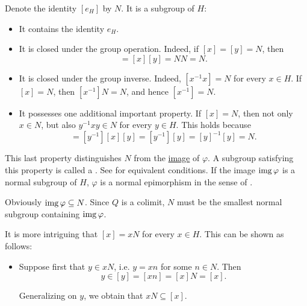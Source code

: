 \begin{definition}
\begin{thmenum}
    Denote the identity \( [e_H] \) by \( N \). It is a subgroup of \( H \):
    \begin{itemize}
      \item It contains the identity \( e_H \).
      \item It is closed under the group operation. Indeed, if \( [x] = [y] = N \), then
      \begin{equation*}
        [xy] = [x][y] = NN = N.
      \end{equation*}

      \item It is closed under the group inverse. Indeed, \( [x^{-1} x] = N \) for every \( x \in H \). If \( [x] = N \), then \( [x^{-1}] N = N \), and hence \( [x^{-1}] = N \).

      \item It possesses one additional important property. If \( [x] = N \), then not only \( x \in N \), but also \( y^{-1} x y \in N \) for every \( y \in H \). This holds because
      \begin{equation*}
        [y^{-1} x y]
        =
        [y^{-1}] [x] [y]
        =
        [y^{-1}] [y]
        =
        [y]^{-1} [y]
        =
        N.
      \end{equation*}
    \end{itemize}

    This last property distinguishes \( N \) from the \hyperref[def:multi_valued_function/image]{image} of \( \varphi \). A subgroup satisfying this property is called a . See  for equivalent conditions. If the image \( \operatorname{img} \varphi \) is a normal subgroup of \( H \), \( \varphi \) is a normal epimorphism in the sense of .

    Obviously \( \operatorname{img} \varphi \subseteq N \). Since \( Q \) is a colimit, \( N \) must be the smallest normal subgroup containing \( \operatorname{img} \varphi \).

    It is more intriguing that \( [x] = xN \) for every \( x \in H \). This can be shown as follows:
    \begin{itemize}
      \item Suppose first that \( y \in xN \), i.e. \( y = xn \) for some \( n \in N \). Then
      \begin{equation*}
        y \in [y] = [xn] = [x] N = [x].
      \end{equation*}

      Generalizing on \( y \), we obtain that \( xN \subseteq [x] \).


\end{itemize}
\end{thmenum}
\end{definition}
